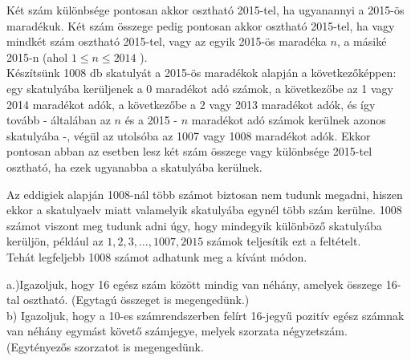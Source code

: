 \begin{solution}
	Két szám különbsége pontosan akkor osztható 2015-tel, ha ugyanannyi
	a 2015-ös maradékuk. Két szám összege pedig pontosan akkor osztható
	2015-tel, ha vagy mindkét szám osztható 2015-tel, vagy az egyik 2015-ös
	maradéka $n$, a másiké 2015-n (ahol $1\leq n\leq2014$ ).\\
	Készítsünk 1008 db skatulyát a 2015-ös maradékok alapján a következőképpen:
	egy skatulyába kerüljenek a 0 maradékot adó számok, a következőbe
	az 1 vagy 2014 maradékot adók, a következőbe a 2 vagy 2013 maradékot
	adók, és így tovább - általában az $n$ és a 2015 - $n$ maradékot
	adó számok kerülnek azonos skatulyába -, végül az utolsóba az 1007
	vagy 1008 maradékot adók. Ekkor pontosan abban az esetben lesz két
	szám összege vagy különbsége 2015-tel osztható, ha ezek ugyanabba
	a skatulyába kerülnek.
	
	Az eddigiek alapján 1008-nál több számot biztosan nem tudunk megadni,
	hiszen ekkor a skatulyaelv miatt valamelyik skatulyába egynél több
	szám kerülne. 1008 számot viszont meg tudunk adni úgy, hogy mindegyik
	különböző skatulyába kerüljön, például az $1,2,3,\ldots,1007,2015$
	számok teljesítik ezt a feltételt.\\
	Tehát legfeljebb 1008 számot adhatunk meg a kívánt módon.
\end{solution}
\begin{extraproblem}
	a.)Igazoljuk, hogy 16 egész szám között mindig van néhány, amelyek
	összege 16-tal osztható. (Egytagú összeget is megengedünk.)\\
	b) Igazoljuk, hogy a 10-es számrendszerben felírt 16-jegyű pozitív
	egész számnak van néhány egymást követő számjegye, melyek szorzata
	négyzetszám. (Egytényezős szorzatot is megengedünk.\\
	
\end{extraproblem}

